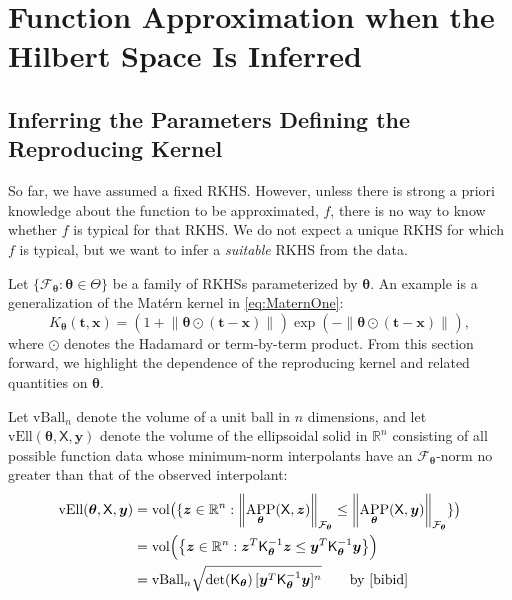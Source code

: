 \documentclass[]{mcom-l}
\theoremstyle{remark}
\newcommand{\vBall}{\text{vBall}_n}
\newcommand{\vEll}{\text{vEll}}
\DeclareMathOperator{\vol}{vol}
\DeclareMathOperator{\APP}{APP}
\newcommand{\reals}{{\mathbb{R}}}
\newcommand{\mK}{\mathsf{K}}
\newcommand{\mX}{\mathsf{X}}
\newcommand{\bx}{{\boldsymbol{x}}}
\newcommand{\by}{{\boldsymbol{y}}}
\newcommand{\bt}{{\boldsymbol{t}}}
\newcommand{\bz}{{\boldsymbol{z}}}
\newcommand{\btheta}{{\boldsymbol{\theta}}}
\newcommand{\calf}{{\mathcal{F}}}
\newcommand{\norm}[2][{}]{\ensuremath{\left \lVert #2 \right \rVert}_{#1}}
\begin{document}
\section{Function Approximation when the Hilbert Space Is Inferred} \label{sec:adaptF}



\subsection{Inferring the Parameters Defining the Reproducing Kernel} \label{sec:adaptTheta}

So far, we have assumed a fixed RKHS.  However, unless there is strong a priori knowledge about the function to be approximated, $f$, there is no way to know whether $f$ is typical for  that RKHS.  We do not expect a unique RKHS for which $f$ is typical, but we want to infer a \emph{suitable} RKHS from the data.  

Let $\{\calf_{\btheta} : \btheta \in \Theta\}$ be a family of RKHSs parameterized by $\btheta$.  An example is a generalization of the Mat\'ern kernel  in \eqref{eq:MaternOne}:
\begin{equation} \label{eq:MaternTheta}
K_\btheta(\bt,\bx) = (1 +  \norm{\btheta \odot (\bt-\bx)}) \exp(-\norm{\btheta \odot (\bt-\bx)}),
\end{equation}
where $\odot$ denotes the Hadamard or term-by-term product.  From this section forward, we highlight the dependence of the reproducing kernel and related quantities on $\btheta$.

Let $\vBall$ denote the volume of a unit ball in $n$ dimensions, and let $\vEll(\btheta,\mX,\by)$ denote the volume of the ellipsoidal solid in $\reals^n$ consisting of all possible function data whose minimum-norm interpolants have an $\calf_{\btheta}$-norm no greater than that of the observed interpolant:
\begin{align*}
\vEll(\btheta,\mX,\by) &= \vol\bigl(\{ \bz \in \reals^n : \norm[\calf_{\btheta}]{\APP_{\btheta}(\mX,\bz)}  \le \norm[\calf_{\btheta}]{\APP_{\btheta}(\mX,\by)} \} \bigr) \\
& = \vol\Bigl( \bigl \{ \bz \in \reals^n : \bz^T \mK_\btheta^{-1} \bz \le \by^T \mK_\btheta^{-1} \by  \bigr \} \Bigr) \\
& = \vBall \sqrt{\det(\mK_{\btheta})  \, [\by^T \mK_\btheta^{-1} \by]^n } \qquad \text{by \cite{bibid}}
\end{align*}
\end{document}
